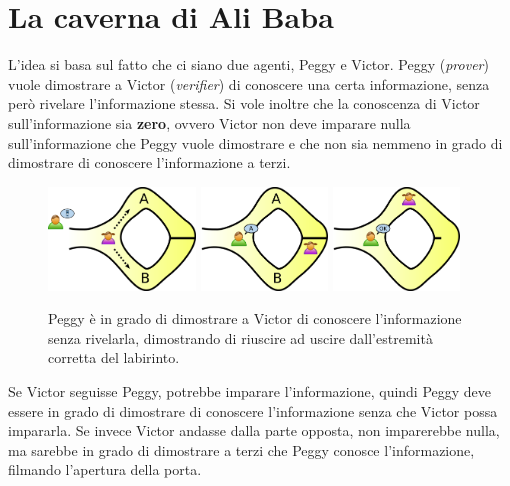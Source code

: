 \section{La caverna di Ali Baba}
L'idea si basa sul fatto che ci siano due agenti, Peggy e Victor. Peggy (\textit{prover}) vuole
dimostrare a Victor (\textit{verifier}) di conoscere una certa informazione, senza però rivelare
l'informazione stessa. Si vole inoltre che la conoscenza di Victor sull'informazione sia
\textbf{zero}, ovvero Victor non deve imparare nulla sull'informazione che Peggy vuole dimostrare
e che non sia nemmeno in grado di dimostrare di conoscere l'informazione a terzi.
\begin{figure}[H]
    \centering
    \includegraphics[width=0.35\textwidth]{img/zero_knowledge1.png}
    \includegraphics[width=0.3\textwidth]{img/zero_knowledge2.png}
    \includegraphics[width=0.3\textwidth]{img/zero_knowledge3.png}
    \caption{Peggy è in grado di dimostrare a Victor di conoscere l'informazione senza rivelarla,
    dimostrando di riuscire ad uscire dall'estremità corretta del labirinto.}
\end{figure}
Se Victor seguisse Peggy, potrebbe imparare l'informazione, quindi Peggy deve essere in grado di 
dimostrare di conoscere l'informazione senza che Victor possa impararla.
Se invece Victor andasse dalla parte opposta, non imparerebbe nulla, ma sarebbe in grado di 
dimostrare a terzi che Peggy conosce l'informazione, filmando l'apertura della porta.


